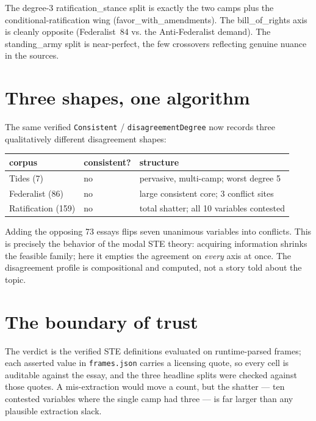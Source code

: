 \documentclass[11pt]{article}
\newcommand{\lean}[1]{\texttt{#1}}
\newcommand{\vv}[1]{\textsf{\small #1}}
\begin{document}
\noindent The degree-3 \vv{ratification\_stance} split is exactly the two
camps plus the conditional-ratification wing (\vv{favor\_with\_amendments}).
The \vv{bill\_of\_rights} axis is cleanly opposite (Federalist~84 vs. the
Anti-Federalist demand). The \vv{standing\_army} split is near-perfect, the
few crossovers reflecting genuine nuance in the sources.

\section{Three shapes, one algorithm}

The same verified \lean{Consistent} / \lean{disagreementDegree} now records
three qualitatively different disagreement shapes:

\begin{center}\small
\begin{tabular}{@{}l l l@{}}
\toprule
corpus & consistent? & structure \\
\midrule
Tides (7) & no & pervasive, multi-camp; worst degree 5 \\
Federalist (86) & no & large consistent core; 3 conflict sites \\
Ratification (159) & no & total shatter; all 10 variables contested \\
\bottomrule
\end{tabular}
\end{center}

Adding the opposing 73 essays flips seven unanimous variables into
conflicts. This is precisely the behavior of the modal STE theory: acquiring
information shrinks the feasible family; here it empties the agreement on
\emph{every} axis at once. The disagreement profile is compositional and
computed, not a story told about the topic.

\section{The boundary of trust}

The verdict is the verified STE definitions evaluated on runtime-parsed
frames; each asserted value in \lean{frames.json} carries a licensing quote,
so every cell is auditable against the essay, and the three headline splits
were checked against those quotes. A mis-extraction would move a count, but
the shatter --- ten contested variables where the single camp had three ---
is far larger than any plausible extraction slack.



\end{document}
